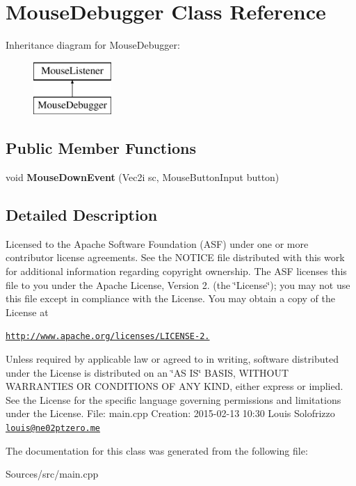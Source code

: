 \hypertarget{class_mouse_debugger}{\section{Mouse\+Debugger Class Reference}
\label{class_mouse_debugger}
}
Inheritance diagram for Mouse\+Debugger\+:\begin{figure}[H]
\begin{center}
\leavevmode
\includegraphics[height=2.000000cm]{class_mouse_debugger}
\end{center}
\end{figure}
\subsection*{Public Member Functions}
\begin{DoxyCompactItemize}
\item 
\hypertarget{class_mouse_debugger_a0d7f7e10a54cd1fc98370467805b24ac}{void {\bfseries Mouse\+Down\+Event} (Vec2i sc, Mouse\+Button\+Input button)}\label{class_mouse_debugger_a0d7f7e10a54cd1fc98370467805b24ac}

\end{DoxyCompactItemize}


\subsection{Detailed Description}
Licensed to the Apache Software Foundation (A\+S\+F) under one or more contributor license agreements. See the N\+O\+T\+I\+C\+E file distributed with this work for additional information regarding copyright ownership. The A\+S\+F licenses this file to you under the Apache License, Version 2. (the \char`\"{}\+License\char`\"{}); you may not use this file except in compliance with the License. You may obtain a copy of the License at

\href{http://www.apache.org/licenses/LICENSE-2.0}{\tt http\+://www.\+apache.\+org/licenses/\+L\+I\+C\+E\+N\+S\+E-\/2.}

Unless required by applicable law or agreed to in writing, software distributed under the License is distributed on an \char`\"{}\+A\+S I\+S\char`\"{} B\+A\+S\+I\+S, W\+I\+T\+H\+O\+U\+T W\+A\+R\+R\+A\+N\+T\+I\+E\+S O\+R C\+O\+N\+D\+I\+T\+I\+O\+N\+S O\+F A\+N\+Y K\+I\+N\+D, either express or implied. See the License for the specific language governing permissions and limitations under the License. File\+: main.\+cpp Creation\+: 2015-\/02-\/13 10\+:30 Louis Solofrizzo \href{mailto:louis@ne02ptzero.me}{\tt louis@ne02ptzero.\+me} 

The documentation for this class was generated from the following file\+:\begin{DoxyCompactItemize}
\item 
Sources/src/main.\+cpp\end{DoxyCompactItemize}
